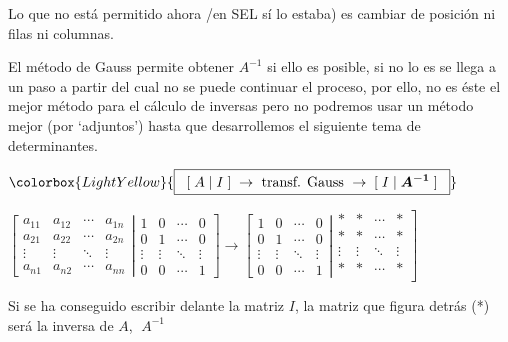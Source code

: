 Lo que no está permitido ahora /en SEL sí lo estaba) es cambiar de posición ni filas ni columnas.

El método de Gauss permite obtener $A^{-1}$ si ello es posible, si no lo es se llega a un paso a partir del cual no se puede continuar el proceso, por ello, no es éste el mejor método para el cálculo de inversas pero no podremos usar un método mejor (por `adjuntos') hasta que desarrollemos el siguiente tema de determinantes.

\vspace{3mm}

\centerline{$\colorbox{LightYellow}{\boxed{ \; \; [\; A \; | \; I \; ] \; \to \text{ transf. Gauss } \to  \; [\; I \; | \; \boldsymbol{ A^{-1} } \; ] \; \; }}$}
\justify


$\left[ \begin{matrix}  a_{11}&a_{12}&\cdots &a_{1n}\\ a_{21}&a_{22}&\cdots &a_{2n}\\ \vdots&\vdots&\ddots&\vdots\\a_{n1}&a_{n2}&\cdots &a_{nn}  \end{matrix} \right|
 \left. \begin{matrix} 1&0&\cdots&0\\ 0&1&\cdots&0\\  \vdots&\vdots&\ddots&\vdots \\0&0&\cdots&1    \end{matrix}   \right] \to
  \left[ \begin{matrix} 1&0&\cdots&0\\ 0&1&\cdots&0\\  \vdots&\vdots&\ddots&\vdots \\0&0&\cdots&1    \end{matrix}   \right|
  \left. \begin{matrix} * & * & \cdots & * \\  * & * & \cdots & * \\  \vdots&\vdots&\ddots&\vdots    \\ * & * & \cdots & * \\   \end{matrix} \right]$


Si se ha conseguido escribir delante la matriz $I$, la matriz que figura detrás (*) será la inversa de $A$, $\; A^{-1}$

